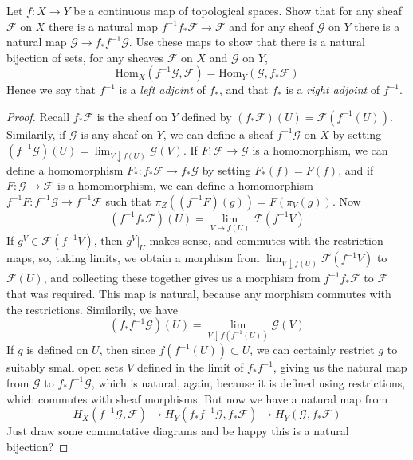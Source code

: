 \begin{theorem}
    Let $f:X \to Y$ be a continuous map of topological spaces. Show that for any sheaf $\mathcal{F}$ on $X$ there is a natural map $f^{-1}f_* \mathcal{F} \to \mathcal{F}$ and for any sheaf $\mathcal{G}$ on $Y$ there is a natural map $\mathcal{G} \to f_* f^{-1} \mathcal{G}$. Use these maps to show that there is a natural bijection of sets, for any sheaves $\mathcal{F}$ on $X$ and $\mathcal{G}$ on $Y$,
    \[ \text{Hom}_X(f^{-1}\mathcal{G}, \mathcal{F}) = \text{Hom}_Y(\mathcal{G}, f_* \mathcal{F}) \]
    Hence we say that $f^{-1}$ is a {\it left adjoint} of $f_*$, and that $f_*$ is a {\it right adjoint} of $f^{-1}$.
\end{theorem}
\begin{proof}
    Recall $f_* \mathcal{F}$ is the sheaf on $Y$ defined by $(f_* \mathcal{F})(U) = \mathcal{F}(f^{-1}(U))$. Similarily, if $\mathcal{G}$ is any sheaf on $Y$, we can define a sheaf $f^{-1} \mathcal{G}$ on $X$ by setting $(f^{-1} \mathcal{G})(U) = \lim_{V \downarrow f(U)} \mathcal{G}(V)$. If $F: \mathcal{F} \to \mathcal{G}$ is a homomorphism, we can define a homomorphism $F_*: f_* \mathcal{F} \to f_* \mathcal{G}$ by setting $F_*(f) = F(f)$, and if $F: \mathcal{G} \to \mathcal{F}$ is a homomorphism, we can define a homomorphism $f^{-1}F: f^{-1} \mathcal{G} \to f^{-1} \mathcal{F}$ such that $\pi_Z((f^{-1} F)(g)) = F(\pi_V (g))$. Now
    \[ (f^{-1} f_* \mathcal{F})(U) = \lim_{V \to f(U)} \mathcal{F}(f^{-1} V) \]
    If $g^V \in \mathcal{F}(f^{-1} V)$, then $g^V|_U$ makes sense, and commutes with the restriction maps, so, taking limits, we obtain a morphism from $\lim_{V \downarrow f(U)} \mathcal{F}(f^{-1} V)$ to $\mathcal{F}(U)$, and collecting these together gives us a morphism from $f^{-1}f_* \mathcal{F}$ to $\mathcal{F}$ that was required. This map is natural, because any morphism commutes with the restrictions. Similarily, we have
    \[ (f_* f^{-1} \mathcal{G})(U) = \lim_{V \downarrow f(f^{-1}(U))} \mathcal{G}(V) \]
    If $g$ is defined on $U$, then since $f(f^{-1}(U)) \subset U$, we can certainly restrict $g$ to suitably small open sets $V$ defined in the limit of $f_*f^{-1}$, giving us the natural map from $\mathcal{G}$ to $f_* f^{-1} \mathcal{G}$, which is natural, again, because it is defined using restrictions, which commutes with sheaf morphisms. But now we have a natural map from
    \[ H_X(f^{-1}\mathcal{G}, \mathcal{F}) \to H_Y(f_*f^{-1}\mathcal{G}, f_* \mathcal{F}) \to H_Y(\mathcal{G}, f_* \mathcal{F}) \]
    Just draw some commutative diagrams and be happy this is a natural bijection?
\end{proof}

